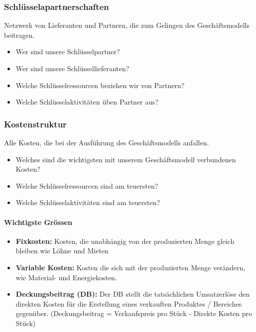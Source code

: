 \subsubsection{Schlüsselapartnerschaften}
Netzwerk von Lieferanten und Partnern, die zum Gelingen des Geschäftsmodells beitragen.
\begin{itemize}
	\item Wer sind unsere Schlüsselpartner?
	\item Wer sind unsere Schlüssellieferanten?
	\item Welche Schlüsselressourcen beziehen wir von Partnern?
	\item Welche Schlüsselaktivitäten üben Partner aus?
\end{itemize}

\subsubsection{Kostenstruktur}
Alle Kosten, die bei der Ausführung des Geschäftsmodells anfallen.
\begin{itemize}
	\item Welches sind die wichtigsten mit unserem Geschäftsmodell verbundenen Kosten?
	\item Welche Schlüsselressourcen sind am teuersten?
	\item Welche Schlüsselaktivitäten sind am teuersten?
\end{itemize}

\paragraph{Wichtigste Grössen}
\begin{itemize}
	\item \textbf{Fixkosten:} Kosten, die unabhängig von der produzierten Menge gleich bleiben wie Löhne und Mieten
	\item \textbf{Variable Kosten:} Kosten die sich mit der produzierten Menge verändern, wie Material- und	Energiekosten.
	\item \textbf{Deckungsbeitrag (DB):} Der DB stellt die tatsächlichen Umsatzerlöse den direkten Kosten für die Erstellung eines verkauften Produktes / Bereiches gegenüber. (Deckungsbeitrag = Verkaufspreis pro Stück - Direkte Kosten pro Stück)
\end{itemize}

